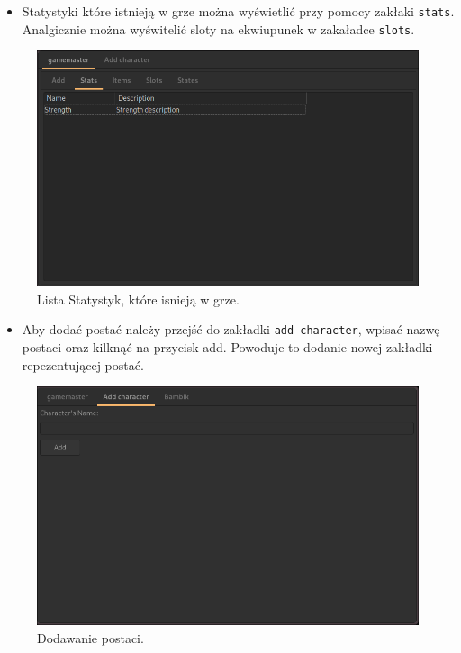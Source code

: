 \documentclass[11pt]{article}
\begin{document}
\begin{itemize}
\item Statystyki które istnieją w grze można wyświetlić przy pomocy zakłaki \texttt{stats}. Analgicznie można wyświtelić sloty na ekwiupunek w zakaładce \texttt{slots}.
\end{itemize}
\begin{figure}[htbp]
\centering
\includegraphics[width=.9\linewidth]{img/gamemasterStatsList.png}
\caption{Lista Statystyk, które isnieją w grze.}
\end{figure}
\begin{itemize}
\item Aby dodać postać należy przejść do zakładki \texttt{add character}, wpisać nazwę postaci oraz kilknąć na przycisk add. Powoduje to dodanie nowej zakładki repezentującej postać.
\end{itemize}
\begin{figure}[htbp]
\centering
\includegraphics[width=.9\linewidth]{img/addingCharacter.png}
\caption{Dodawanie postaci.}
\end{figure}
\end{document}
